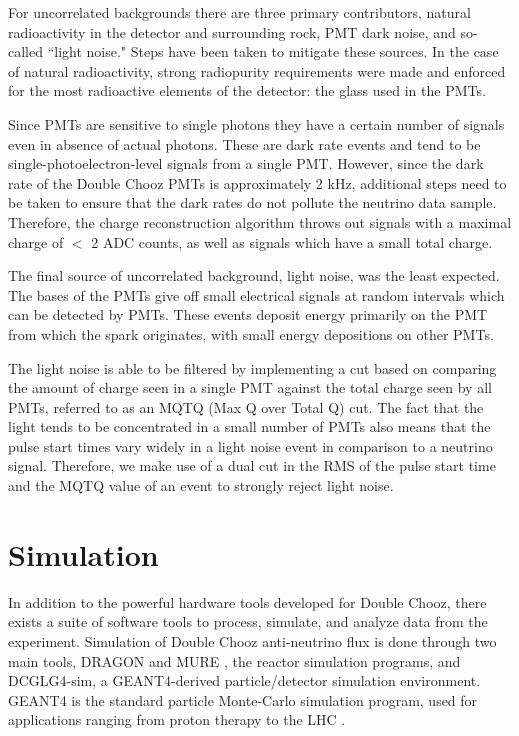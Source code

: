 For uncorrelated backgrounds there are three primary contributors, natural radioactivity in the detector and surrounding rock, PMT dark noise, and so-called ``light noise." Steps have been taken to mitigate these sources. In the case of natural radioactivity, strong radiopurity requirements were made and enforced for the most radioactive elements of the detector: the glass used in the PMTs.

Since PMTs are sensitive to single photons they have a certain number of signals even in absence of actual photons. These are dark rate events and tend to be single-photoelectron-level signals from a single PMT. However, since the dark rate of the Double Chooz PMTs is approximately 2 kHz, additional steps need to be taken to ensure that the dark rates do not pollute the neutrino data sample. Therefore, the charge reconstruction algorithm throws out signals with a maximal charge of $<$ 2 ADC counts, as well as signals which have a small total charge. 

The final source of uncorrelated background, light noise, was the least expected. The bases of the PMTs give off small electrical signals at random intervals which can be detected by PMTs. These events deposit energy primarily on the PMT from which the spark originates, with small energy depositions on other PMTs. 
	
The light noise is able to be filtered by implementing a cut based on comparing the amount of charge seen in a single PMT against the total charge seen by all PMTs, referred to as an MQTQ (Max Q over Total Q) cut. The fact that the light tends to be concentrated in a small number of PMTs also means that the pulse start times vary widely in a light noise event in comparison to a neutrino signal. Therefore, we make use of a dual cut in the RMS of the pulse start time and the MQTQ value of an event to strongly reject light noise. 

\section{Simulation}
  In addition to the powerful hardware tools developed for Double Chooz, there exists a suite of software tools to process, simulate, and analyze data from the experiment. Simulation of Double Chooz anti-neutrino flux is done through two main tools, DRAGON and MURE \cite{DC_2013}, the reactor simulation programs, and DCGLG4-sim, a GEANT4-derived particle/detector simulation environment. GEANT4 is the standard particle Monte-Carlo simulation program, used for applications ranging from proton therapy to the LHC \cite{G4}. 
  
